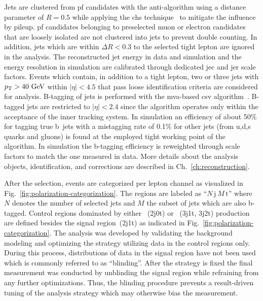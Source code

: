 Jets are clustered from \gls{pf} candidates with the anti-\kt algorithm using a distance parameter of $R=0.5$ while applying the \gls{chs} technique~\cite{CMS-PAS-JME-14-001} to mitigate the influence by pileup. \gls{pf} candidates belonging to preselected muon or electron candidates that are loosely isolated are not clustered into jets to prevent double counting. In addition, jets which are within $\Delta R<0.3$ to the selected tight lepton are ignored in the analysis. The reconstructed jet energy in data and simulation and the energy resolution in simulation are calibrated through dedicated \gls{jec} and \gls{jer} scale factors. Events which contain, in addition to a tight lepton, two or three jets with $p_\textrm{T}>40~\textrm{GeV}$ within $|\eta|<4.5$ that pass loose identification criteria are considered for analysis. B-tagging of jets is performed with the \gls{mva}-based \gls{csv} algorithm~\cite{Chatrchyan:2012jua}. B-tagged jets are restricted to $|\eta|<2.4$ since the algorithm operates only within the acceptance of the inner tracking system. In simulation an efficiency of about 50\% for tagging true b~jets with a mistagging rate of 0.1\% for other jets (from u,d,s quarks and gluons) is found at the employed tight working point of the algorithm. In simulation the b-tagging efficiency is reweighted through scale factors to match the one measured in data. More details about the analysis objects, identification, and corrections are described in Ch.~\ref{ch:reconstruction}.

After the selection, events are categorized per lepton channel as visualized in Fig.~\ref{fig:polarization-categorization}. The regions are labeled as ``$N\,\mathrm{j}~M\,\mathrm{t}$'' where $N$ denotes the number of selected jets and $M$ the subset of jets which are also b-tagged. Control regions dominated by either \wjets~(2j0t) or \ttbar~(3j1t, 3j2t) production are defined besides the signal region~(2j1t) as indicated in Fig.~\ref{fig:polarization-categorization}. The analysis was developed by validating the background modeling and optimizing the strategy utilizing data in the control regions only. During this process, distributions of data in the signal region have not been used which is commonly referred to as ``blinding''. After the strategy is fixed the final measurement was conducted by unblinding the signal region while refraining from any further optimizations. Thus, the blinding procedure prevents a result-driven tuning of the analysis strategy which may otherwise bias the measurement.

